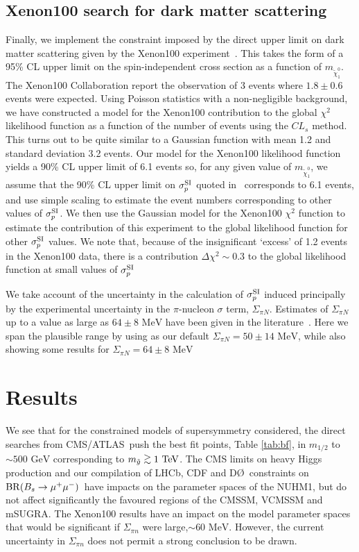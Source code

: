 \documentclass[cits]{PoS}
\newcommand{\gsim}
{\;\raisebox{-.3em}{$\stackrel{\displaystyle >}{\sim}$}\;}
\newcommand{\br}{{\rm BR}}
\newcommand{\bmm}{\ensuremath{\br(B_s \to \mu^+\mu^-)}\ }
\newcommand{\ssi}{\ensuremath{\sigma^{\rm SI}_p}}
\newcommand{\mneu}[1]{m_{\tilde \chi^0_{#1}}}
\newcommand{\tev}{\,\, \mathrm{TeV}}
\newcommand{\gev}{\,\, \mathrm{GeV}}
\newcommand{\mev}{\,\, \mathrm{MeV}}
\newcommand{\cmsATLAS}{CMS/ATLAS\ }
\begin{document}
\subsection{Xenon100 search for dark matter scattering}
Finally, we implement the constraint imposed by the direct upper limit
on dark matter scattering given by the Xenon100 experiment~\cite{Xenon100new}. 
This takes the form of a 95\% CL upper limit on the spin-independent cross section as a function of $\mneu{1}$. 
The Xenon100 Collaboration report the observation of 3 events where $1.8 \pm 0.6$ events were expected.
Using Poisson statistics with a non-negligible background,
we have constructed a model for the Xenon100 contribution to the
global $\chi^2$ likelihood function as a function of the number of events using the $CL_s$ method.
This turns out to be quite similar to a Gaussian function with mean 1.2 and standard deviation 3.2 events.
Our model for the Xenon100 likelihood function yields a 90\% CL upper limit of 6.1 events so,
for any given value of $\mneu{1}$, we assume that the 90\% CL upper limit on
$\ssi$ quoted in~\cite{Xenon100new} corresponds to 6.1 events,
and use simple scaling to estimate the event numbers corresponding to other values of $\ssi$.
We then use the Gaussian model for the Xenon100 $\chi^2$ function to estimate the
contribution of this experiment to the global likelihood function for other $\ssi$ values.
We note that, because of the insignificant `excess' of 1.2 events in the Xenon100 data,
there is a contribution $\Delta \chi^2 \sim 0.3$ to the global likelihood function
at small values of \ssi~%

We take account of the uncertainty in the calculation of $\ssi$  
induced principally by the experimental uncertainty in the $\pi$-nucleon
$\sigma$ term, $\Sigma_{\pi N}$.
Estimates of $\Sigma_{\pi N}$ up to a value as large as 
$64 \pm 8 \mev$ have been given in the literature~\cite{Pavan:2001wz}.
Here we span the plausible range by using as our default $\Sigma_{\pi N} = 50 \pm 14 \mev$, while
also showing some results for $\Sigma_{\pi N} = 64 \pm 8 \mev$~%

\section{Results}
We see that for the constrained models of supersymmetry considered, the direct
searches from \cmsATLAS push the best fit points, Table \ref{tab:bf}, in $m_{1/2}$ to $\sim 500\gev$
corresponding to $m_{\tilde{g}}\gsim1\tev$. The CMS limits on heavy Higgs
production and our compilation of LHCb, CDF and D\O\ constraints on \bmm have
impacts on the parameter spaces of the NUHM1, but do not affect significantly 
the favoured regions of the CMSSM, VCMSSM and mSUGRA.
The Xenon100 results have an impact on the model parameter spaces that would be significant
if $\Sigma_{\pi n}$ were large,$\sim60\mev$. However, the current uncertainty in
$\Sigma_{\pi n}$ does not permit a strong conclusion to be drawn.
\end{document}
